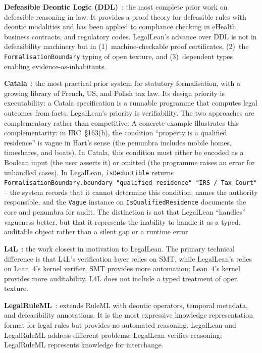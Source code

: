 \documentclass[runningheads]{llncs}
\begin{document}
\textbf{Defeasible Deontic Logic
(DDL)}~\cite{governatori2005representing,governatori2019compliance}: the most
complete prior work on defeasible reasoning in law. It provides a proof theory
for defeasible rules with deontic modalities and has been applied to compliance
checking in eHealth, business contracts, and regulatory codes. LegalLean's
advance over DDL is not in defeasibility machinery but in (1)~machine-checkable
proof certificates, (2)~the \texttt{FormalisationBoundary} typing of open
texture, and (3)~dependent types enabling evidence-as-inhabitants.

\textbf{Catala}~\cite{merigoux2021catala}: the most practical prior system for
statutory formalisation, with a growing library of French, US, and Polish tax
law. Its design priority is executability: a Catala specification is a runnable
programme that computes legal outcomes from facts. LegalLean's priority is
verifiability. The two approaches are complementary rather than competitive. A
concrete example illustrates this complementarity: in IRC~\S163(h), the
condition ``property is a qualified residence'' is vague in Hart's sense (the
penumbra includes mobile homes, timeshares, and boats). In Catala, this
condition must either be encoded as a Boolean input (the user asserts it) or
omitted (the programme raises an error for unhandled cases). In LegalLean,
\texttt{isDeductible} returns \texttt{FormalisationBoundary.boundary~"qualified~residence"~"IRS~/~Tax~Court"}
-- the system records that it cannot determine this condition, names the
authority responsible, and the \texttt{Vague} instance on
\texttt{IsQualifiedResidence} documents the core and penumbra for audit. The
distinction is not that LegalLean ``handles'' vagueness better, but that it
represents the inability to handle it as a typed, auditable object rather than a
silent gap or a runtime error.

\textbf{L4L}~\cite{hou2021l4l}: the work closest in motivation to LegalLean.
The primary technical difference is that L4L's verification layer relies on SMT,
while LegalLean's relies on Lean~4's kernel verifier. SMT provides more
automation; Lean~4's kernel provides more auditability. L4L does not include a
typed treatment of open texture.

\textbf{LegalRuleML}~\cite{palmirani2018modelling}: extends RuleML with deontic
operators, temporal metadata, and defeasibility annotations. It is the most
expressive knowledge representation format for legal rules but provides no
automated reasoning. LegalLean and LegalRuleML address different problems:
LegalLean verifies reasoning; LegalRuleML represents knowledge for interchange.
\end{document}
